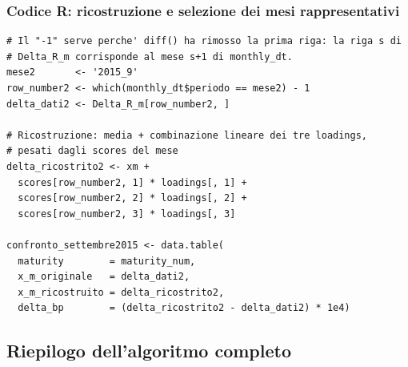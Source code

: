 \documentclass[11pt,a4paper]{article}
\theoremstyle{plain}
\theoremstyle{definition}
\theoremstyle{remark}
\begin{document}
\subsubsection{Codice R: ricostruzione e selezione dei mesi rappresentativi}

\begin{codebox}
\begin{Verbatim}[fontsize=\small]
# Il "-1" serve perche' diff() ha rimosso la prima riga: la riga s di
# Delta_R_m corrisponde al mese s+1 di monthly_dt.
mese2       <- '2015_9'
row_number2 <- which(monthly_dt$periodo == mese2) - 1
delta_dati2 <- Delta_R_m[row_number2, ]

# Ricostruzione: media + combinazione lineare dei tre loadings,
# pesati dagli scores del mese
delta_ricostrito2 <- xm +
  scores[row_number2, 1] * loadings[, 1] +
  scores[row_number2, 2] * loadings[, 2] +
  scores[row_number2, 3] * loadings[, 3]

confronto_settembre2015 <- data.table(
  maturity        = maturity_num,
  x_m_originale   = delta_dati2,
  x_m_ricostruito = delta_ricostrito2,
  delta_bp        = (delta_ricostrito2 - delta_dati2) * 1e4)
\end{Verbatim}
\end{codebox}

\subsection{Riepilogo dell'algoritmo completo}
\end{document}
